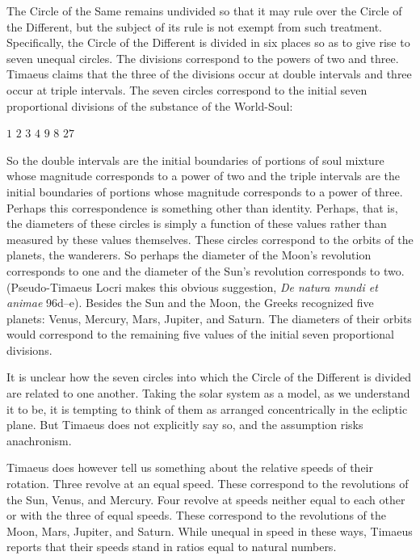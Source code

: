 The Circle of the Same remains undivided so that it may rule over the Circle of the Different, but the subject of its rule is not exempt from such treatment. Specifically, the Circle of the Different is divided in six places so as to give rise to seven unequal circles. The divisions correspond to the powers of two and three. Timaeus claims that the three of the divisions occur at double intervals and three occur at triple intervals. The seven circles correspond to the initial seven proportional divisions of the substance of the World-Soul:
\begin{center}
	\( 1 \) \( 2 \) \( 3 \) \( 4 \) \( 9 \) \( 8 \) \( 27 \)
\end{center}
So the double intervals are the initial boundaries of portions of soul mixture whose magnitude corresponds to a power of two and the triple intervals are the initial boundaries of portions whose magnitude corresponds to a power of three. Perhaps this correspondence is something other than identity. Perhaps, that is, the diameters of these circles is simply a function of these values rather than measured by these values themselves. These circles correspond to the orbits of the planets, the wanderers. So perhaps the diameter of the Moon's revolution corresponds to one and the diameter of the Sun's revolution corresponds to two. (Pseudo-Timaeus Locri makes this obvious suggestion, \emph{De natura mundi et animae} 96d--e). Besides the Sun and the Moon, the Greeks recognized five planets: Venus, Mercury, Mars, Jupiter, and Saturn. The diameters of their orbits would correspond to the remaining five values of the initial seven proportional divisions.

It is unclear how the seven circles into which the Circle of the Different is divided are related to one another. Taking the solar system as a model, as we understand it to be, it is tempting to think of them as arranged concentrically in the ecliptic plane. But Timaeus does not explicitly say so, and the assumption risks anachronism.

Timaeus does however tell us something about the relative speeds of their rotation. Three revolve at an equal speed. These correspond to the revolutions of the Sun, Venus, and Mercury. Four revolve at speeds neither equal to each other or with the three of equal speeds. These correspond to the revolutions of the Moon, Mars, Jupiter, and Saturn. While unequal in speed in these ways, Timaeus reports that their speeds stand in ratios equal to natural numbers.

